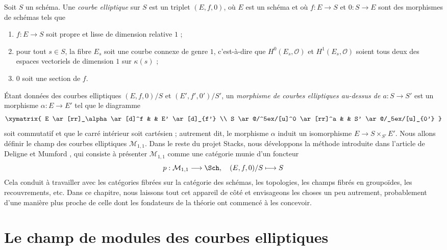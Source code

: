 \noindent
Soit $S$ un schéma. Une {\it courbe elliptique} sur $S$ est un triplet
$(E, f, 0)$, où $E$ est un schéma et où $f : E \to S$ et $0 : S \to E$
sont des morphismes de schémas tels que
\begin{enumerate}
\item $f : E \to S$ soit propre et lisse de dimension relative $1$ ;
\item pour tout $s \in S$, la fibre $E_s$ soit une courbe connexe
de genre $1$, c'est-à-dire que $H^0(E_s, \mathcal{O})$ et
$H^1(E_s, \mathcal{O})$ soient tous deux des espaces vectoriels de dimension
$1$ sur $\kappa(s)$ ;
\item $0$ soit une section de $f$.
\end{enumerate}
Étant données des courbes elliptiques $(E, f, 0)/S$ et $(E', f', 0')/S'$, un
{\it morphisme de courbes elliptiques au-dessus de $a : S \to S'$}
est un morphisme $\alpha : E \to E'$ tel que le diagramme
$$
\xymatrix{
E \ar[rr]_\alpha \ar[d]^f & & E' \ar[d]_{f'}  \\
S \ar@/^5ex/[u]^0 \ar[rr]^a & & S' \ar@/_5ex/[u]_{0'}
}
$$
soit commutatif et que le carré intérieur soit cartésien ; autrement dit, le
morphisme $\alpha$ induit un isomorphisme $E \to S \times_{S'} E'$.
Nous allons définir le champ des courbes elliptiques $\mathcal{M}_{1, 1}$.
Dans le reste du projet Stacks, nous développons la méthode introduite dans
l'article de Deligne et Mumford \cite{DM}, qui consiste à présenter
$\mathcal{M}_{1, 1}$ comme une catégorie munie d'un foncteur
$$
p : \mathcal{M}_{1, 1} \longrightarrow \Sch, \quad
(E, f, 0)/S \longmapsto S
$$
Cela conduit à travailler avec les catégories fibrées sur la catégorie des
schémas, les topologies, les champs fibrés en groupoïdes, les recouvrements,
etc. Dans ce chapitre, nous laissons tout cet appareil de côté et envisageons
les choses un peu autrement, probablement d'une manière plus proche de celle
dont les fondateurs de la théorie ont commencé à les concevoir.


\section{Le champ de modules des courbes elliptiques}
\label{section-moduli-elliptic-curves}

